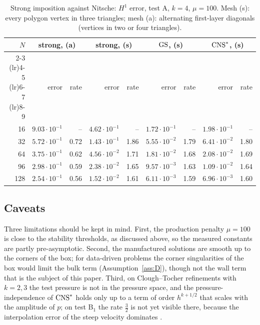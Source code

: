 \begin{table}[t]
\centering\small
\caption{Strong imposition against Nitsche: $H^1$ error, test A, $k=4$, $\mu=100$. Mesh (s): every polygon vertex in three triangles; mesh (a): alternating first-layer diagonals (vertices in two or four triangles).}\label{tab:strong}
\begin{tabular}{rrrrrrrrr}
\toprule
$N$ & \multicolumn{2}{c}{strong, (a)} & \multicolumn{2}{c}{strong, (s)} & \multicolumn{2}{c}{$\mathrm{GS}$, (s)} & \multicolumn{2}{c}{$\mathrm{CNS}^\ast$, (s)}\\
\cmidrule(lr){2-3} \cmidrule(lr){4-5} \cmidrule(lr){6-7} \cmidrule(lr){8-9}
 & error & rate & error & rate & error & rate & error & rate\\
\midrule
16 & $9.03\cdot10^{-1}$ & -- & $4.62\cdot10^{-1}$ & -- & $1.72\cdot10^{-1}$ & -- & $1.98\cdot10^{-1}$ & --\\
32 & $5.72\cdot10^{-1}$ & 0.72 & $1.43\cdot10^{-1}$ & 1.86 & $5.55\cdot10^{-2}$ & 1.79 & $6.41\cdot10^{-2}$ & 1.80\\
64 & $3.75\cdot10^{-1}$ & 0.62 & $4.56\cdot10^{-2}$ & 1.71 & $1.81\cdot10^{-2}$ & 1.68 & $2.08\cdot10^{-2}$ & 1.69\\
96 & $2.98\cdot10^{-1}$ & 0.59 & $2.38\cdot10^{-2}$ & 1.65 & $9.57\cdot10^{-3}$ & 1.63 & $1.09\cdot10^{-2}$ & 1.64\\
128 & $2.54\cdot10^{-1}$ & 0.56 & $1.52\cdot10^{-2}$ & 1.61 & $6.11\cdot10^{-3}$ & 1.59 & $6.96\cdot10^{-3}$ & 1.60\\
\bottomrule
\end{tabular}
\end{table}

\subsection{Caveats}
Three limitations should be kept in mind. First, the production penalty $\mu=100$ is close to the stability thresholds, as discussed above, so the measured constants are partly pre-asymptotic. Second, the manufactured solutions are smooth up to the corners of the box; for data-driven problems the corner singularities of the box would limit the bulk term (Assumption~\ref{ass:D}), though not the wall term that is the subject of this paper. Third, on Clough--Tocher refinements with $k=2,3$ the test pressure is not in the pressure space, and the pressure-independence of $\mathrm{CNS}^\ast$ holds only up to a term of order $h^{k+1/2}$ that scales with the amplitude of $p$; on test B$_1$ the rate $\frac32$ is not yet visible there, because the interpolation error of the steep velocity dominates \cite{PadhiExt}.
